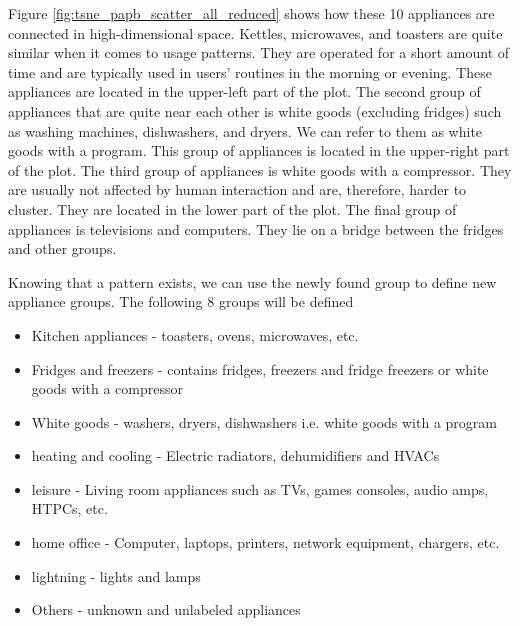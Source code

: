 Figure \ref{fig:tsne_papb_scatter_all_reduced} shows how these 10 appliances are connected in high-dimensional space.
Kettles, microwaves, and toasters are quite similar when it comes to usage patterns.
They are operated for a short amount of time and are typically used in users' routines in the morning or evening.
These appliances are located in the upper-left part of the plot.
The second group of appliances that are quite near each other is white goods (excluding fridges) such as washing machines, dishwashers, and dryers.
We can refer to them as white goods with a program.
This group of appliances is located in the upper-right part of the plot.
The third group of appliances is white goods with a compressor.
They are usually not affected by human interaction and are, therefore, harder to cluster.
They are located in the lower part of the plot.
The final group of appliances is televisions and computers.
They lie on a bridge between the fridges and other groups.



Knowing that a pattern exists, we can use the newly found group to define new appliance groups.
The following 8 groups will be defined
\begin{itemize}
    \item Kitchen appliances - toasters, ovens, microwaves, etc.
    \item Fridges and freezers  - contains fridges, freezers and fridge freezers or white goods with a compressor
    \item White goods - washers, dryers, dishwashers i.e. white goods with a program
    \item heating and cooling - Electric radiators, dehumidifiers and HVACs
    \item leisure -  Living room appliances such as TVs, games consoles, audio amps, HTPCs, etc.
    \item home office - Computer, laptops, printers, network equipment, chargers, etc.
    \item lightning - lights and lamps
    \item Others - unknown and unlabeled appliances
\end{itemize}

